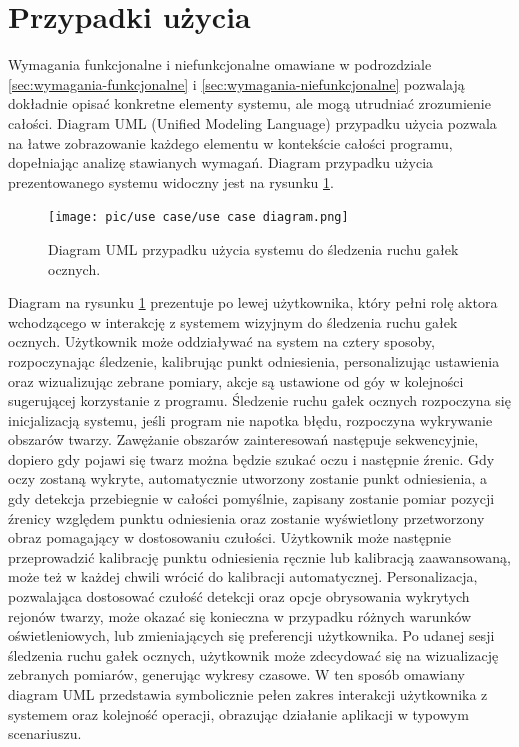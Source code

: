 \documentclass[a4paper,twoside,12pt]{book}
\begin{document}
\section{Przypadki użycia}
\label{sec:przypadki-uzycia}

Wymagania funkcjonalne i niefunkcjonalne omawiane w podrozdziale \ref{sec:wymagania-funkcjonalne} i \ref{sec:wymagania-niefunkcjonalne} pozwalają dokładnie opisać konkretne elementy systemu, ale mogą utrudniać zrozumienie całości. Diagram UML (Unified Modeling Language) przypadku użycia pozwala na łatwe zobrazowanie każdego elementu w kontekście całości programu, dopełniając analizę stawianych wymagań. Diagram przypadku użycia prezentowanego systemu widoczny jest na rysunku \ref{fig:UML-use-case}. 

\begin{figure}[htbp]
	\centering
	\texttt{[image: pic/use case/use case diagram.png]}
	\caption{Diagram UML przypadku użycia systemu do śledzenia ruchu gałek ocznych.}
	\label{fig:UML-use-case}
\end{figure}

Diagram na rysunku \ref{fig:UML-use-case} prezentuje po lewej użytkownika, który pełni rolę aktora wchodzącego w interakcję z systemem wizyjnym do śledzenia ruchu gałek ocznych. Użytkownik może oddziaływać na system na cztery sposoby, rozpoczynając śledzenie, kalibrując punkt odniesienia, personalizując ustawienia oraz wizualizując zebrane pomiary, akcje są ustawione od góy w kolejności sugerującej korzystanie z programu. Śledzenie ruchu gałek ocznych rozpoczyna się inicjalizacją systemu, jeśli program nie napotka błędu, rozpoczyna wykrywanie obszarów twarzy. Zawężanie obszarów zainteresowań następuje sekwencyjnie, dopiero gdy pojawi się twarz można będzie szukać oczu i następnie źrenic. Gdy oczy zostaną wykryte, automatycznie utworzony zostanie punkt odniesienia, a gdy detekcja przebiegnie w całości pomyślnie, zapisany zostanie pomiar pozycji źrenicy względem punktu odniesienia oraz zostanie wyświetlony przetworzony obraz pomagający w dostosowaniu czułości. Użytkownik może następnie przeprowadzić kalibrację punktu odniesienia ręcznie lub kalibracją zaawansowaną, może też w każdej chwili wrócić do kalibracji automatycznej. Personalizacja, pozwalająca dostosować czułość detekcji oraz opcje obrysowania wykrytych rejonów twarzy, może okazać się konieczna w przypadku różnych warunków oświetleniowych, lub zmieniających się preferencji użytkownika. Po udanej sesji śledzenia ruchu gałek ocznych, użytkownik może zdecydować się na wizualizację zebranych pomiarów, generując wykresy czasowe. W ten sposób omawiany diagram UML przedstawia symbolicznie pełen zakres interakcji użytkownika z systemem oraz kolejność operacji, obrazując działanie aplikacji w typowym scenariuszu.
\end{document}
